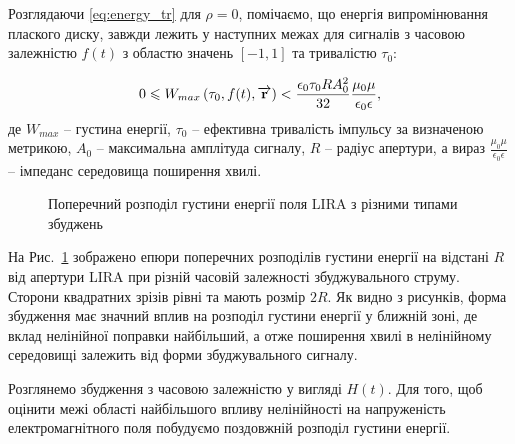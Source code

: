 Розглядаючи \ref{eq:energy_tr} для $ \rho = 0 $, помічаємо, що енергія 
випромінювання плаского диску, завжди лежить у наступних межах для 
сигналів з часовою залежністю $ f(t) $ з областю значень 
$ \left[ -1, 1 \right] $ та тривалістю $ \tau_0 $:

%
%
\begin{equation}
0 \leqslant W_{max} \left( \tau_0, f(t), \overrightarrow{\mathbf r} \right) < 
\frac{\epsilon_0 \tau_0 R A_0^2}{32} \frac{\mu_0 \mu}{\epsilon_0 \epsilon},
\end{equation}
%
де $ W_{max} $ -- густина енергії, $ \tau_0 $ -- ефективна тривалість імпульсу 
за визначеною метрикою, $ A_0 $ -- максимальна амплітуда сигналу, $ R $ -- 
радіус апертури, а вираз $ \frac{\mu_0 \mu}{\epsilon_0 \epsilon} $ -- імпеданс 
середовища поширення хвилі.

\begin{figure}
\caption{Поперечний розподіл густини енергії поля LIRA з різними типами збуджень}
\label{fig:trans_dist}
\end{figure}

На Рис.~\ref{fig:trans_dist} зображено епюри поперечних розподілів 
густини енергії на відстані $ R $ від апертури LIRA при різній часовій 
залежності збуджувального струму. Сторони квадратних зрізів рівні 
та мають розмір $ 2R $. Як видно з рисунків, форма збудження має 
значний вплив на розподіл густини енергії у ближній зоні, де вклад 
нелінійної поправки найбільший, а отже поширення хвилі в 
нелінійному середовищі залежить від форми збуджувального 
сигналу.


Розглянемо збудження з часовою залежністю у вигляді $ H(t) $. Для того, щоб 
оцінити межі області найбільшого впливу нелінійності на напруженість 
електромагнітного поля побудуємо поздовжній розподіл густини енергії. 

